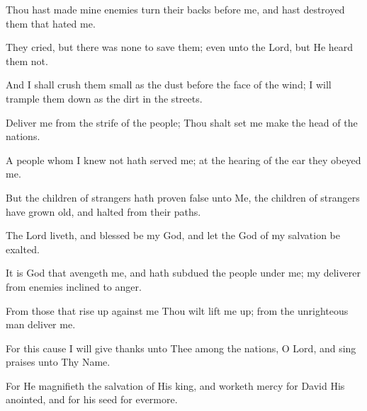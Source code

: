 Thou hast made mine enemies turn their backs before me, and hast destroyed them that hated me.

They cried, but there was none to save them; even unto the Lord, but He heard them not.

And I shall crush them small as the dust before the face of the wind; I will trample them down as the dirt in the streets.

Deliver me from the strife of the people; Thou shalt set me make the head of the nations.

A people whom I knew not hath served me; at the hearing of the ear they obeyed me.

But the children of strangers hath proven false unto Me, the children of strangers have grown old, and halted from their paths.

The Lord liveth, and blessed be my God, and let the God of my salvation be exalted.

It is God that avengeth me, and hath subdued the people under me; my deliverer from enemies inclined to anger.

From those that rise up against me Thou wilt lift me up; from the unrighteous man deliver me.

For this cause I will give thanks unto Thee among the nations, O Lord, and sing praises unto Thy Name.

For He magnifieth the salvation of His king, and worketh mercy for David His anointed, and for his seed for evermore.
